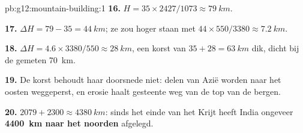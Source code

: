 \begin{solution}{pb:g12:mountain-building:1}
\textbf{16.} $H = 35 \times 2427/1073 \approx \qty{79}{km}$.

\textbf{17.} $\Delta H = 79 - 35 = \qty{44}{km}$; ze zou hoger staan met
$44 \times 550/3380 \approx \qty{7.2}{km}$.

\textbf{18.} $\Delta H = 4.6 \times 3380/550 \approx \qty{28}{km}$, een korst
van $35 + 28 = \qty{63}{km}$ dik, dicht bij de gemeten \qty{70}{km}.

\textbf{19.} De korst behoudt haar doorsnede niet: delen van Azië worden
naar het oosten weggeperst, en erosie haalt gesteente weg van de top van de
bergen.

\textbf{20.} $2079 + 2300 \approx \qty{4380}{km}$: sinds het einde van het
Krijt heeft India ongeveer \textbf{\qty{4400}{km} naar het noorden} afgelegd.
\end{solution}
